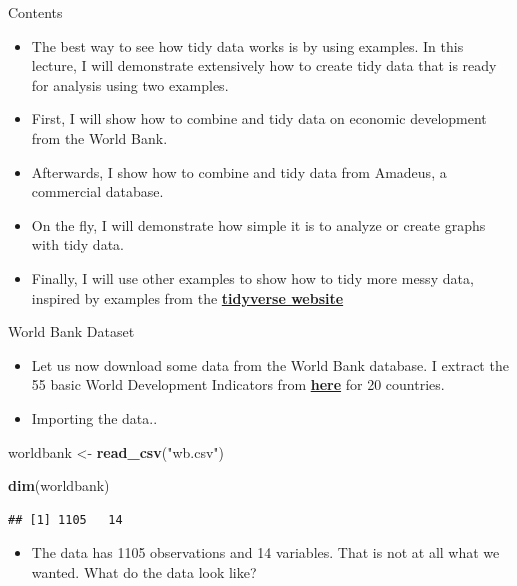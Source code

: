 \documentclass[10pt,ignorenonframetext,]{beamer}
\newenvironment{Shaded}{\begin{snugshade}}{\end{snugshade}}
\newcommand{\KeywordTok}[1]{\textcolor[rgb]{0.13,0.29,0.53}{\textbf{#1}}}
\newcommand{\NormalTok}[1]{#1}
\newcommand{\StringTok}[1]{\textcolor[rgb]{0.31,0.60,0.02}{#1}}
\providecommand{\tightlist}{%
  \setlength{\itemsep}{0pt}\setlength{\parskip}{0pt}}
\begin{document}
\begin{frame}{Contents}
\protect\hypertarget{contents}{}

\begin{itemize}
\item
  The best way to see how tidy data works is by using examples. In this
  lecture, I will demonstrate extensively how to create tidy data that
  is ready for analysis using two examples.
\item
  First, I will show how to combine and tidy data on economic
  development from the World Bank.
\item
  Afterwards, I show how to combine and tidy data from Amadeus, a
  commercial database.
\item
  On the fly, I will demonstrate how simple it is to analyze or create
  graphs with tidy data.
\item
  Finally, I will use other examples to show how to tidy more messy
  data, inspired by examples from the
  \href{https://tidyr.tidyverse.org/reference/pivot_longer.html}{\textbf{tidyverse
  website}}
\end{itemize}

\end{frame}

\begin{frame}[fragile]{World Bank Dataset}
\protect\hypertarget{world-bank-dataset}{}

\begin{itemize}
\item
  Let us now download some data from the World Bank database. I extract
  the 55 basic World Development Indicators from
  \href{https://databank.worldbank.org/source/world-development-indicators/}{\textbf{here}}
  for 20 countries.
\item
  Importing the data..
\end{itemize}

\begin{Shaded}
\begin{Highlighting}[]
\NormalTok{worldbank <-}\StringTok{ }\KeywordTok{read_csv}\NormalTok{(}\StringTok{"wb.csv"}\NormalTok{)}

\KeywordTok{dim}\NormalTok{(worldbank)}
\end{Highlighting}
\end{Shaded}

\begin{verbatim}
## [1] 1105   14
\end{verbatim}

\begin{itemize}
\tightlist
\item
  The data has 1105 observations and 14 variables. That is not at all
  what we wanted. What do the data look like?
\end{itemize}

\end{frame}
\end{document}
